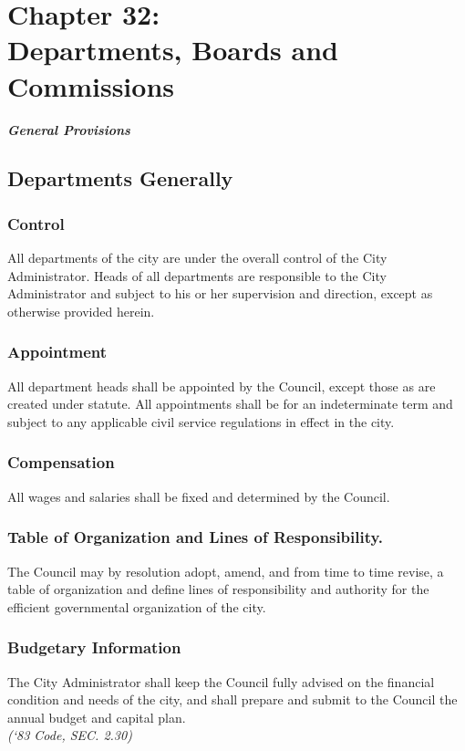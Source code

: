 \chapter*{Chapter 32: \\
	Departments, Boards and Commissions}
    \minitoc
    \pagebreak

\centerline{\textbf{\emph{\LARGE{General Provisions}}}}
\section{Departments Generally}
\subsection{Control}
All departments of the city are under the overall control of the City Administrator. Heads of all departments are responsible to the City Administrator and subject to his or her supervision and direction, except as otherwise provided herein.
\subsection{Appointment}
All department heads shall be appointed by the Council, except those as are created under statute. All appointments shall be for an indeterminate term and subject to any applicable civil service regulations in effect in the city.
\subsection{Compensation}
All wages and salaries shall be fixed and determined by the Council.
\subsection{Table of Organization and Lines of Responsibility.}
The Council may by resolution adopt, amend, and from time to time revise, a table of organization and define lines of responsibility and authority for the efficient governmental organization of the city.
\subsection{Budgetary Information}
The City Administrator shall keep the Council fully advised on the financial condition and needs of the city, and shall prepare and submit to the Council the annual budget and capital plan.\\
\emph{(‘83 Code, SEC. 2.30)}


